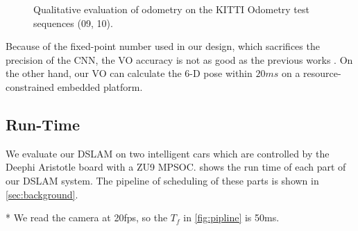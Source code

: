 \begin{figure}[t]
    \caption{Qualitative evaluation of odometry on the KITTI Odometry test sequences (09, 10).}
    \label{fig:VO}
  \end{figure}


Because of the fixed-point number used in our design, which sacrifices the precision of the CNN, the VO accuracy is not as good as the previous works \cite{Mur-Artal:2017281, Zhan:2018e92}. On the other hand, our VO can calculate the 6-D pose within $20ms$ on a resource-constrained embedded platform.


\subsection{Run-Time}

We evaluate our DSLAM on two intelligent cars which are controlled by the Deephi Aristotle board with a ZU9 MPSOC.  shows the run time of each part of our DSLAM system. The pipeline of scheduling of these parts is shown in \cref{sec:background}.



\begin{table}[h]
    \centering
    \caption{Run-Time of each part in our DSLAM}
    \footnotesize
    \begin{threeparttable}
  \begin{tablenotes}
        \item[*] We read the camera at 20fps, so the $T_{f}$ in \cref{fig:pipline} is 50ms.
        \end{tablenotes}
      \end{threeparttable}
    \label{tab:time}%
    
  \end{table}%


